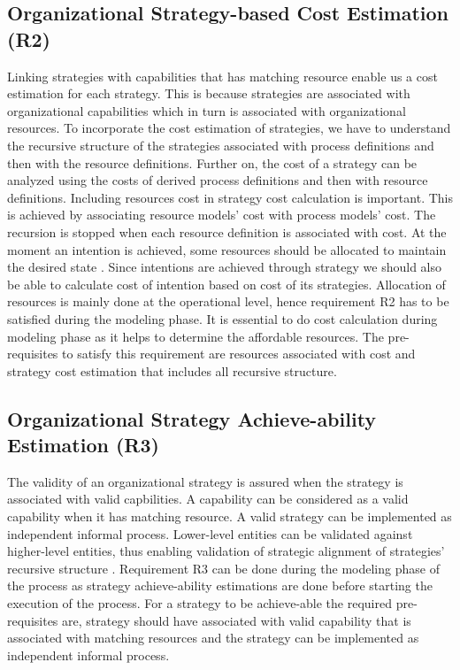 \subsection{Organizational Strategy-based Cost Estimation (R2)}
Linking strategies with capabilities that has matching resource enable us a cost estimation for each strategy. This is because strategies are associated with organizational capabilities which in turn is associated with organizational resources. To incorporate the cost estimation of strategies, we have to understand the recursive structure of the strategies associated with process definitions and then with the resource definitions. Further on, the cost of a strategy can be analyzed using the costs of derived process definitions and then with resource definitions. Including resources cost in strategy cost calculation is important. This is achieved by associating resource models' cost with process models' cost. The recursion is stopped when each resource definition is associated with cost. At the moment an intention is achieved, some resources should be allocated to maintain the desired state \cite{Mandic2010}. Since intentions are achieved through strategy we should also be able to calculate cost of intention based on cost of its strategies. Allocation of resources is mainly done at the operational level, hence requirement R2 has to be satisfied during the modeling phase. It is essential to do cost calculation during modeling phase as it helps to determine the affordable resources. The pre-requisites to satisfy this requirement are resources associated with cost and strategy cost estimation that includes all recursive structure.

\subsection{Organizational Strategy Achieve-ability Estimation (R3)}
 The validity of an organizational strategy is assured when the strategy is associated with valid capbilities. A capability can be considered as a valid capability when it has matching resource. A valid strategy can be implemented as independent informal process. Lower-level entities can be validated against higher-level entities, thus enabling validation of strategic alignment of strategies' recursive structure \cite{Bleistein2006}. Requirement R3  can be done during the modeling phase of the process as strategy achieve-ability estimations are done before starting the execution of the process. For a strategy to be achieve-able the required pre-requisites are, strategy should have associated with valid capability that is associated with matching resources and the strategy can be implemented as independent informal process.
 

